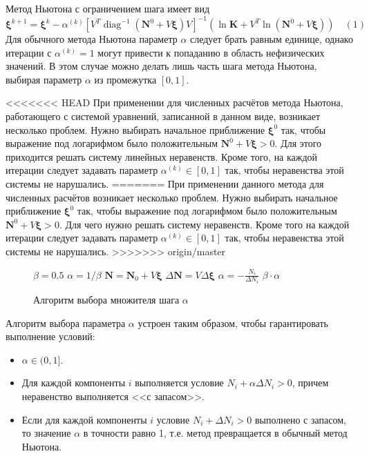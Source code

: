 \documentclass[14pt,a4paper]{extarticle}
\newcounter{algorithmic}
\newenvironment{myalgorithmic}[1][0]{\stepcounter{algorithmic}\begin{algorithmic}[#1]}{\end{algorithmic}}
\newcommand{\diag}{\operatorname{diag}}
\renewcommand{\vec}[1]{\boldsymbol{\mathbf{#1}}}
\begin{document}
Метод Ньютона с ограничением шага \cite{kalit} имеет вид
$$\vec{\xi}^{k+1} = \vec{\xi}^{k} - \alpha^{(k)}[V^T\diag^{-1}(\vec{N}^0 + V\vec{\xi})V]^{-1}(\ln{\vec{K}} + V^T \ln{(\vec{N}^0 + V\vec{\xi})}) \quad (1)$$
Для обычного метода Ньютона параметр $\alpha$ следует брать равным единице, однако итерации с $\alpha^{(k)} = 1$ могут привести к попаданию в область нефизических значений. В этом случае можно делать лишь часть шага метода Ньютона, выбирая параметр $\alpha$ из промежутка $[0, 1]$.   

<<<<<<< HEAD
При применении для численных расчётов метода Ньютона, работающего с системой уравнений, записанной в данном виде, возникает несколько проблем. Нужно выбирать начальное приближение $\vec{\xi}^0$ так, чтобы выражение под логарифмом было положительным $\vec{N}^0 + V\vec{\xi} > 0$. Для этого приходится решать систему линейных неравенств. Кроме того, на каждой итерации следует задавать параметр $\alpha^{(k)} \in [0,1]$ так, чтобы неравенства этой системы не нарушались.  
=======
При применении данного метода для численных расчётов возникает несколько проблем. Нужно выбирать начальное приближение $\vec{\xi}^0$ так, чтобы выражение под логарифмом было положительным $\vec{N}^0 + V\vec{\xi} > 0$. Для чего нужно решать систему неравенств. Кроме того на каждой итерации следует задавать параметр $\alpha^{(k)} \in [0,1]$ так, чтобы неравенства этой системы не нарушались.  
>>>>>>> origin/master
\begin{figure}[!h]
\begin{myalgorithmic}[1]
\Function{ChooseAlpha}{$\vec N_0, V, \vec \xi,\Delta \vec \xi$}
\State $\beta = 0.5$ 
\State $\alpha = 1 / \beta$
\State $\vec N = \vec N_0 + V \vec \xi$ 
\State $\Delta \vec N = V \Delta \vec \xi$ 
\State $\alpha = -\frac{N_i}{\Delta N_i}$ 
\EndIf
\EndFor
\State \Return $\beta \cdot \alpha$
\EndFunction
\end{myalgorithmic}
\caption{Алгоритм выбора множителя шага $\alpha$}
\end{figure}

Алгоритм выбора параметра $\alpha$ устроен таким образом, чтобы гарантировать выполнение условий:
\begin{itemize}
\item $\alpha \in (0, 1]$.
\item Для каждой компоненты $i$ выполняется условие $N_i + \alpha \Delta N_i > 0$, причем неравенство выполняется <<с запасом>>.
\item Если для каждой компоненты $i$ условие $N_i + \Delta N_i > 0$ выполнено с запасом, то значение $\alpha$ в точности равно 1, т.е. метод превращается в обычный метод Ньютона.
\end{itemize}
\end{document}
